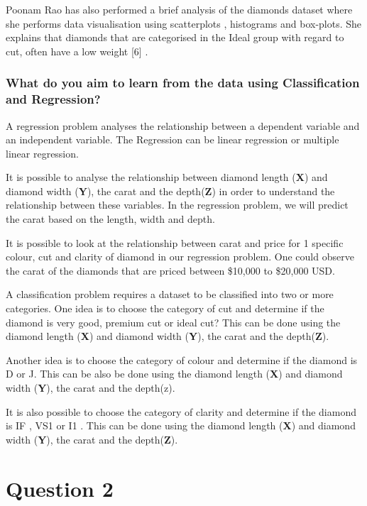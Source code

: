 \documentclass[
]{article}
\begin{document}
Poonam Rao has also performed a brief analysis of the diamonds dataset
where she performs data visualisation using scatterplots , histograms
and box-plots. She explains that diamonds that are categorised in the
Ideal group with regard to cut, often have a low weight {[}6{]} .

\subsubsection{What do you aim to learn from the data using
Classification and
Regression?}\label{what-do-you-aim-to-learn-from-the-data-using-classification-and-regression}

A regression problem analyses the relationship between a dependent
variable and an independent variable. The Regression can be linear
regression or multiple linear regression.

It is possible to analyse the relationship between diamond length
(\textbf{X}) and diamond width (\textbf{Y}), the carat and the
depth(\textbf{Z}) in order to understand the relationship between these
variables. In the regression problem, we will predict the carat based on
the length, width and depth.

It is possible to look at the relationship between carat and price for 1
specific colour, cut and clarity of diamond in our regression problem.
One could observe the carat of the diamonds that are priced between
\$10,000 to \$20,000 USD.

A classification problem requires a dataset to be classified into two or
more categories. One idea is to choose the category of cut and determine
if the diamond is very good, premium cut or ideal cut? This can be done
using the diamond length (\textbf{X}) and diamond width (\textbf{Y}),
the carat and the depth(\textbf{Z}).

Another idea is to choose the category of colour and determine if the
diamond is D or J. This can be also be done using the diamond length
(\textbf{X}) and diamond width (\textbf{Y}), the carat and the depth(z).

It is also possible to choose the category of clarity and determine if
the diamond is IF , VS1 or I1 . This can be done using the diamond
length (\textbf{X}) and diamond width (\textbf{Y}), the carat and the
depth(\textbf{Z}).

\section{Question 2}\label{question-2}
\end{document}
